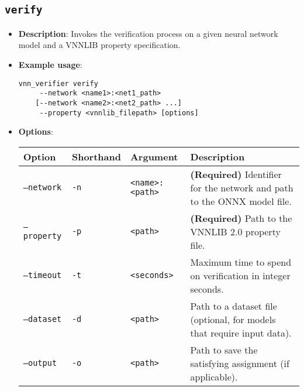 \subsection{\texttt{verify}}
\begin{itemize}
    \item \textbf{Description}: Invokes the verification process on a given neural network model and a VNNLIB property specification.
    \item \textbf{Example usage}:
    \begin{lstlisting}[style=bash]
vnn_verifier verify
	 --network <name1>:<net1_path> 
	[--network <name2>:<net2_path> ...] 
	 --property <vnnlib_filepath> [options] \end{lstlisting}
    \item \textbf{Options}:
    \begin{longtable}{@{}>{\raggedright\arraybackslash\ttfamily}p{}%
                    >{\raggedright\arraybackslash\ttfamily}p{}%
                    >{\raggedright\arraybackslash\ttfamily}p{}%
                    >{\raggedright\arraybackslash}p{}@{}}%
        \toprule
        Option & Shorthand & Argument & Description \\
        \midrule
        \bottomrule
        \texttt{--network} & \texttt{-n} & \texttt{<name>:<path>} & \textbf{(Required)} Identifier for the network and path to the ONNX model file. \\
        \texttt{--property} & \texttt{-p} & \texttt{<path>} & \textbf{(Required)} Path to the VNNLIB 2.0 property file. \\
        \texttt{--timeout} & \texttt{-t} & \texttt{<seconds>} & Maximum time to spend on verification in integer seconds. \\
        \texttt{--dataset} & \texttt{-d} & \texttt{<path>} & Path to a dataset file (optional, for models that require input data).\\
        \texttt{--output} & \texttt{-o} & \texttt{<path>} & Path to save the satisfying assignment (if applicable). \\
    \end{longtable}
    

\end{itemize}
